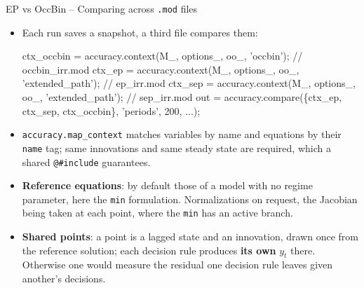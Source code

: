 \documentclass[11pt,aspectratio=169]{beamer}
\newcommand{\code}[1]{\texttt{#1}}
\begin{document}
\begin{frame}[fragile]{EP vs OccBin -- Comparing across \code{.mod} files}

\begin{itemize}

\item Each run saves a snapshot, a third file compares them:
\begin{semiverbatim}\scriptsize
ctx_occbin = accuracy.context(M_, options_, oo_, 'occbin'); // occbin_irr.mod
ctx_ep  = accuracy.context(M_, options_, oo_, 'extended_path'); // ep_irr.mod
ctx_sep = accuracy.context(M_, options_, oo_, 'extended_path'); // sep_irr.mod
out = accuracy.compare(\{ctx_ep, ctx_sep, ctx_occbin\}, 'periods', 200, ...);
\end{semiverbatim}

\item \code{accuracy.map\_context} matches variables by name and equations by their \code{name} tag; same innovations and same steady state are required, which a shared \code{@\#include} guarantees.\newline

\item \textbf{Reference equations}: by default those of a model with no regime parameter, here the \code{min} formulation. Normalizations on request, the Jacobian being taken at each point, where the \code{min} has an active branch.\newline

\item \textbf{Shared points}: a point is a lagged state and an innovation, drawn once from the reference solution; each decision rule produces \textbf{its own} $y_t$ there. Otherwise one would measure the residual one decision rule leaves given another's decisions.\newline

\end{itemize}

\end{frame}
\end{document}
